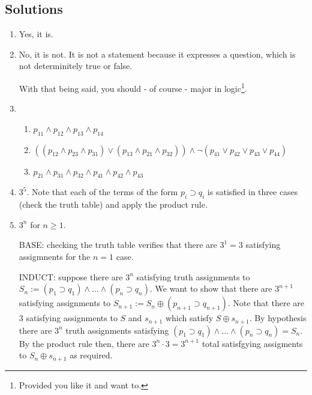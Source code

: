 \begin{mdframed}[linewidth=1]
\section*{Solutions}
\begin{enumerate}
    \item Yes, it is.  

    \item No, it is not. It is not a statement because it expresses a question, which is not determinitely true or false. 

    With that being said, you should - of course - major in logic\footnote{Provided you like it and want to.}.

    \item 
    \begin{enumerate}
        \item $p_{11} \land p_{12} \land p_{13} \land p_{14}$

        \item $((p_{12} \land p_{23} \land p_{31}) \vee (p_{13} \land p_{21} \land p_{32})) \land \lnot(p_{41} \vee p_{42} \vee p_{43} \vee p_{44})$

        \item $p_{21} \land p_{31} \land p_{32} \land p_{41} \land p_{42} \land p_{43}$
    \end{enumerate}

    \item $3^5$. Note that each of the terms of the form $p_i \supset q_i$ is satisfied in three cases (check the truth table) and apply the product rule. 

    \item $3^n$ for $n \geq 1$. 

    BASE: checking the truth table verifies that there are $3^1 = 3$ satisfying assigmnents for the $n = 1$ case. 

    INDUCT: suppose there are $3^n$ satisfying truth assignments to $S_n := (p_1 \supset q_1) \land ... \land (p_n \supset q_n)$. We want to show that there are $3^{n + 1}$ satisfying assignments to $S_{n + 1} := S_n \oplus (p_{n + 1} \supset q_{n + 1})$. Note that there are $3$ satisfying assignments to $S$ and $s_{n + 1}$ which satisfy $S \oplus s_{n + 1}$. By hypothesis there are $3^n$ truth assignments satisfying $(p_1 \supset q_1) \land ... \land (p_n \supset q_n) = S_n$. By the product rule then, there are $3^n \cdot 3 = 3^{n + 1}$ total satisfgying assigments to $S_n \oplus s_{n + 1}$ as required. 


\end{enumerate}
\end{mdframed}
